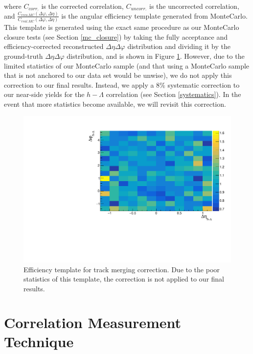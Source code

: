 \documentclass[ALICE,manyauthors]{ALICE_analysis_notes}
\begin{document}
where $C_{corr.}$ is the corrected correlation, $C_{uncorr.}$ is the uncorrected correlation, and $\frac{C_{reco. MC}(\Delta\varphi, \Delta\eta)}{C_{real. MC}(\Delta\varphi, \Delta\eta)}$ is the angular efficiency template generated from MonteCarlo. This template is generated using the exact same procedure as our MonteCarlo closure tests (see Section \ref{mc_closure}) by taking the fully acceptance and efficiency-corrected reconstructed $\Delta\eta\Delta\varphi$ distribution and dividing it by the ground-truth $\Delta\eta\Delta\varphi$ distribution, and is shown in Figure \ref{trackmerge_efficiency_plot}. However, due to the limited statistics of our MonteCarlo sample (and that using a MonteCarlo sample that is not anchored to our data set would be unwise), we do not apply this correction to our final results. Instead, we apply a 8\% systematic correction to our near-side yields for the $h-\Lambda$ correlation (see Section \ref{systematics}). In the event that more statistics become available, we will revisit this correction.


\begin{figure}[ht]
\centering
\includegraphics[width=5in]{figures/trackmerge_efficiency_PLACEHOLDER.pdf}
\caption{Efficiency template for track merging correction. Due to the poor statistics of this template, the correction is not applied to our final results.}
\label{trackmerge_efficiency_plot}
\end{figure}

\section{Correlation Measurement Technique}
\label{corrsec}
\end{document}
